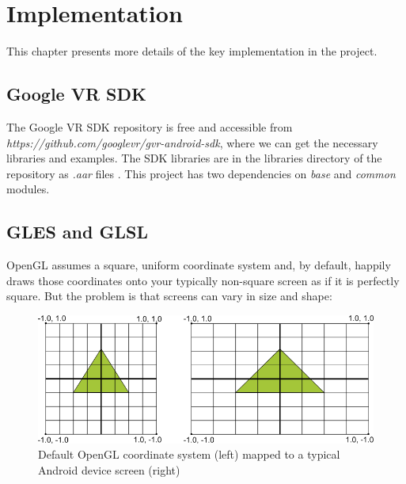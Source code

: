 \label{chapter-implementation}
\chapter{Implementation}

This chapter presents more details of the key implementation in the project.

\section{Google VR SDK}

The Google VR SDK repository is free and accessible from \emph{https://github.com/googlevr/gvr-android-sdk}, where we can get the necessary libraries and examples. The SDK libraries are in the libraries directory of the repository as \emph{.aar} files \parencite{google.aar-format.2016}. This project has two dependencies on \emph{base} and \emph{common} modules.

\section{GLES and GLSL}

OpenGL assumes a square, uniform coordinate system and, by default, happily draws those coordinates onto your typically non-square screen as if it is perfectly square. But the problem is that screens can vary in size and shape:

\begin{figure}[H]
\caption[opengl-coordinates]{Default OpenGL coordinate system (left) mapped to a typical Android device screen (right) \parencite{google.opengles.2016}}
\label{fig:opengl-coordinates}
\centering
\includegraphics[width=\linewidth]{Figures/opengl-coordinates.png}
\decoRule
\end{figure}

